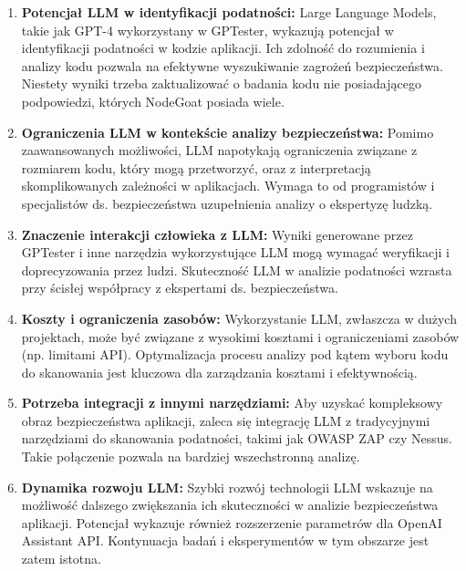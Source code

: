 \begin{enumerate}
    \item \textbf{Potencjał LLM w identyfikacji podatności:} Large Language Models, takie jak GPT-4 wykorzystany w GPTester, wykazują potencjał w identyfikacji podatności w kodzie aplikacji. Ich zdolność do rozumienia i analizy kodu pozwala na efektywne wyszukiwanie zagrożeń bezpieczeństwa. Niestety wyniki trzeba zaktualizować o badania kodu nie posiadającego podpowiedzi, których NodeGoat posiada wiele. 
    
    \item \textbf{Ograniczenia LLM w kontekście analizy bezpieczeństwa:} Pomimo zaawansowanych możliwości, LLM napotykają ograniczenia związane z rozmiarem kodu, który mogą przetworzyć, oraz z interpretacją skomplikowanych zależności w aplikacjach. Wymaga to od programistów i specjalistów ds. bezpieczeństwa uzupełnienia analizy o ekspertyzę ludzką.
    
    \item \textbf{Znaczenie interakcji człowieka z LLM:} Wyniki generowane przez GPTester i inne narzędzia wykorzystujące LLM mogą wymagać weryfikacji i doprecyzowania przez ludzi. Skuteczność LLM w analizie podatności wzrasta przy ścisłej współpracy z ekspertami ds. bezpieczeństwa.
    
    \item \textbf{Koszty i ograniczenia zasobów:} Wykorzystanie LLM, zwłaszcza w dużych projektach, może być związane z wysokimi kosztami i ograniczeniami zasobów (np. limitami API). Optymalizacja procesu analizy pod kątem wyboru kodu do skanowania jest kluczowa dla zarządzania kosztami i efektywnością.
    
    \item \textbf{Potrzeba integracji z innymi narzędziami:} Aby uzyskać kompleksowy obraz bezpieczeństwa aplikacji, zaleca się integrację LLM z tradycyjnymi narzędziami do skanowania podatności, takimi jak OWASP ZAP czy Nessus. Takie połączenie pozwala na bardziej wszechstronną analizę.
    
    \item \textbf{Dynamika rozwoju LLM:} Szybki rozwój technologii LLM wskazuje na możliwość dalszego zwiększania ich skuteczności w analizie bezpieczeństwa aplikacji. Potencjał wykazuje również rozszerzenie parametrów dla OpenAI Assistant API. Kontynuacja badań i eksperymentów w tym obszarze jest zatem istotna.
\end{enumerate}